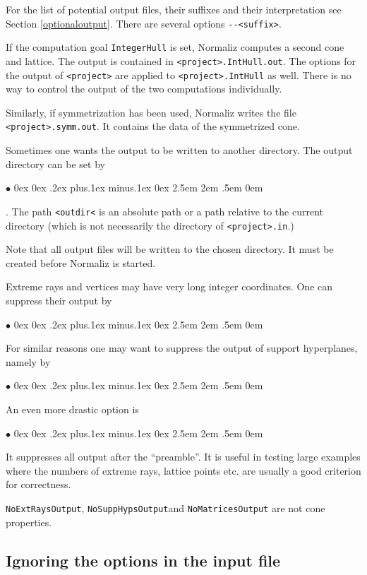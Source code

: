 \documentclass[12pt,a4paper]{scrartcl}
\newcommand{\stdli}{ \topsep0ex \partopsep0ex %
\parsep.2ex plus.1ex minus.1ex \itemsep0ex%
\leftmargin2.5em \labelwidth2em \labelsep.5em \rightmargin0em}%
\renewenvironment{itemize}{\begin{list}{{$\bullet$}}{\stdli}}{\end{list}}
\theoremstyle{definition}
\def\itemtt[#1]{\item[\textbf{\ttt{#1}}]}
\def\ttt{\texttt}
\begin{document}
For the list of potential output files, their suffixes and their interpretation
see Section \ref{optionaloutput}. There are several options \verb|--<suffix>|.

If the computation goal \verb|IntegerHull| is set, Normaliz computes a second cone and lattice. The output is contained in \verb|<project>.IntHull.out|. The options for the output of \verb|<project>| are applied to \verb|<project>.IntHull| as well. There is no way to control the output of the two computations individually.

Similarly, if symmetrization has been used, Normaliz writes the file \verb|<project>.symm.out|. It contains the data of the symmetrized cone.

Sometimes one wants the output to be written to another directory. The output directory can be set by
\begin{itemize}
	\itemtt[{-}{-OutputDir=<outdir>}]. The path \ttt{<outdir<} is an absolute path or a path relative to the current directory (which is not necessarily the directory of \verb|<project>.in|.)	
\end{itemize}
Note that all output files will be written to the chosen directory. It must be created before Normaliz is started.

Extreme rays and vertices may have very long integer coordinates. One can suppress their output by
\begin{itemize}
	\itemtt[NoExtRaysOutput] 
\end{itemize}
For similar reasons one may want to suppress the output of support hyperplanes, namely by
\begin{itemize}
	\itemtt[NoSuppHypsOutput] 
\end{itemize}

An even more drastic option is
\begin{itemize}
	\itemtt[NoMatricesOutput] 
\end{itemize}
It suppresses all output after the ``preamble''. It is useful in testing large examples where the numbers of extreme rays, lattice points etc. are usually a good criterion for correctness.

\verb|NoExtRaysOutput|, \verb|NoSuppHypsOutput|and \verb|NoMatricesOutput|  are not cone properties.

\subsection{Ignoring the options in the input file}
\end{document}
